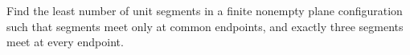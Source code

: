 Find the least number of unit segments in a finite nonempty plane configuration such that segments meet only at common endpoints, and exactly three segments meet at every endpoint.
